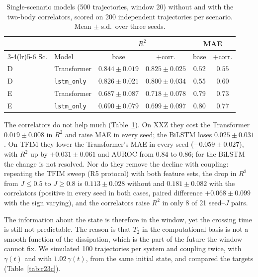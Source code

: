 \documentclass[twocolumn,10pt]{article}
\begin{document}
\begin{table}[h]
\centering
\caption{Single-scenario models (500 trajectories, window 20) without and
  with the two-body correlators, scored on 200 independent trajectories
  per scenario. Mean $\pm$ s.d.\ over three seeds.\label{tab:r23}}
\footnotesize
\setlength{\tabcolsep}{2.5pt}
\begin{tabular}{llcccc}
\toprule
 & & \multicolumn{2}{c}{$R^2$} & \multicolumn{2}{c}{MAE} \\
\cmidrule(lr){3-4}\cmidrule(lr){5-6}
Sc. & Model & base & $+$corr. & base & $+$corr. \\
\midrule
D & Transformer & $\mathbf{0.844 \pm 0.019}$ & $0.825 \pm 0.025$ & $0.52$ & $0.55$ \\
D & \texttt{lstm\_only} & $0.826 \pm 0.021$ & $0.800 \pm 0.034$ & $0.55$ & $0.60$ \\
E & Transformer & $0.687 \pm 0.087$ & $\mathbf{0.718 \pm 0.078}$ & $0.79$ & $0.73$ \\
E & \texttt{lstm\_only} & $0.690 \pm 0.079$ & $0.699 \pm 0.097$ & $0.80$ & $0.77$ \\
\bottomrule
\end{tabular}
\end{table}

The correlators do not help much (Table~\ref{tab:r23}). On XXZ they cost
the Transformer $0.019 \pm 0.008$ in $R^2$ and raise MAE in every seed;
the BiLSTM loses $0.025 \pm 0.031$. On TFIM they lower the Transformer's
MAE in every seed ($-0.059 \pm 0.027$), with $R^2$ up by
$+0.031 \pm 0.061$ and AUROC from $0.84$ to $0.86$; for the BiLSTM the
change is not resolved.
Nor do they remove the decline with coupling: repeating the TFIM sweep
(R5 protocol) with both feature sets, the drop in $R^2$ from
$J \le 0.5$ to $J \ge 0.8$ is $0.113 \pm 0.028$ without and
$0.181 \pm 0.082$ with the correlators (positive in every seed in both
cases, paired difference $+0.068 \pm 0.099$ with the sign varying), and
the correlators raise $R^2$ in only 8 of 21 seed--$J$ pairs.

The information about the state is therefore in the window, yet the
crossing time is still not predictable. The reason is that $T_2$ in the
computational basis is not a smooth function of the dissipation, which
is the part of the future the window cannot fix. We simulated 100
trajectories per system and coupling twice, with $\gamma(t)$ and with
$1.02\,\gamma(t)$, from the same initial state, and compared the targets
(Table~\ref{tab:r23c}).
\end{document}
